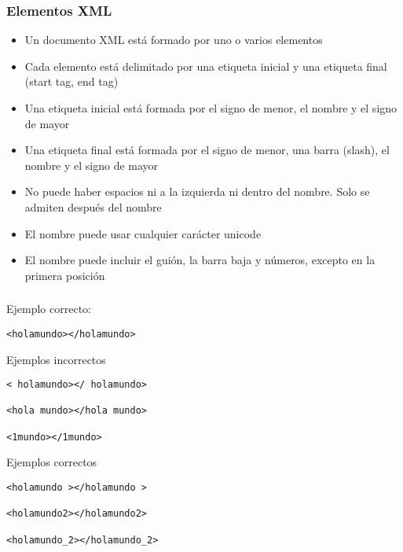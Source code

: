 \documentclass[ucs]{beamer}
\begin{document}
\begin{frame}[fragile]
\frametitle{Elementos XML}
\begin{itemize}
\item
Un documento XML está formado por uno o varios elementos

\item
Cada elemento está delimitado por una etiqueta inicial
y una etiqueta final (start tag, end tag)
\item
Una etiqueta inicial está formada por el signo de menor, el nombre y el signo de mayor
\item
Una etiqueta final está formada por el signo de menor, una barra (slash), el nombre y el signo de mayor
\item
No puede haber espacios ni a la izquierda ni dentro del nombre. Solo se admiten después del nombre
\item
El nombre puede usar cualquier carácter unicode
\item
El nombre puede incluir el guión, la barra baja y números, excepto en la primera posición
\end{itemize}

\end{frame}

\begin{frame}[fragile]
\frametitle{}

Ejemplo correcto:
  \begin{footnotesize}
  \begin{verbatim}
<holamundo></holamundo>
  \end{verbatim}
  \end{footnotesize}

Ejemplos incorrectos
  \begin{footnotesize}
  \begin{verbatim}
< holamundo></ holamundo>

<hola mundo></hola mundo>

<1mundo></1mundo>
  \end{verbatim}
  \end{footnotesize}

Ejemplos correctos

  \begin{footnotesize}
  \begin{verbatim}
<holamundo ></holamundo >

<holamundo2></holamundo2>

<holamundo_2></holamundo_2>
  \end{verbatim}
  \end{footnotesize}

\end{frame}
\end{document}
